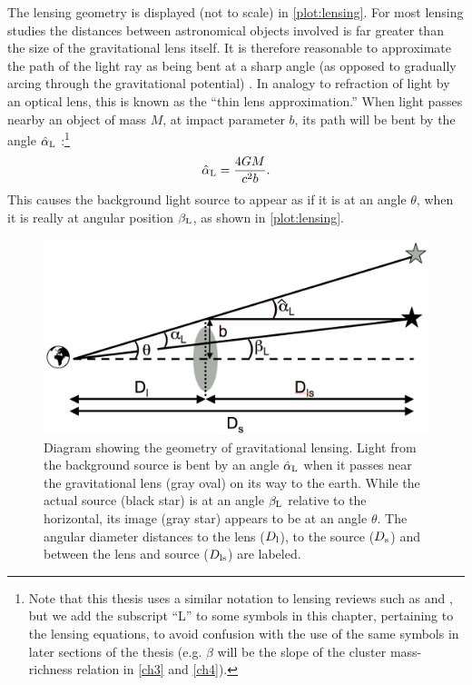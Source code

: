 The lensing geometry is displayed (not to scale) in \autoref{plot:lensing}. For most lensing studies the distances between astronomical objects involved is far greater than the size of the gravitational lens itself. It is therefore reasonable to approximate the path of the light ray as being bent at a sharp angle (as opposed to gradually arcing through the gravitational potential) \citep{BS01}. In analogy to refraction of light by an optical lens, this is known as the ``thin lens approximation.'' When light passes nearby an object of mass $M$, at impact parameter $b$, its path will be bent by the angle $\hat{\alpha}_{\rm L}$ \citep{RydenText}:\footnote{Note that this thesis uses a similar notation to lensing reviews such as \citet{BS01} and \citet{Schneider06_WeakGravLens}, but we add the subscript ``L'' to some symbols in this chapter, pertaining to the lensing equations, to avoid confusion with the use of the same symbols in later sections of the thesis (e.g. $\beta$ will be the slope of the cluster mass-richness relation in \autoref{ch3} and \autoref{ch4}).}
\begin{equation}
\label{eqn:deflection}
\hat{\alpha}_{\rm L} = \frac{4GM}{c^2 b}.
\end{equation}
This causes the background light source to appear as if it is at an angle $\theta$, when it is really at angular position $\beta_{\rm L}$, as shown in \autoref{plot:lensing}.

\begin{figure}
\begin{center}
\includegraphics[scale=0.4]{plots_intro/LensDiagram.png}
\caption[Gravitational Lensing Diagram]{Diagram showing the geometry of gravitational lensing. Light from the background source is bent by an angle $\hat{\alpha}_{\rm L}$ when it passes near the gravitational lens (gray oval) on its way to the earth. While the actual source (black star) is at an angle $\beta_{\rm L}$ relative to the horizontal, its image (gray star) appears to be at an angle $\theta$. The angular diameter distances to the lens ($D_{\rm l}$), to the source ($D_{\rm s}$) and between the lens and source ($D_{\rm ls}$) are labeled.}
\label{plot:lensing}
\end{center}
\end{figure}

